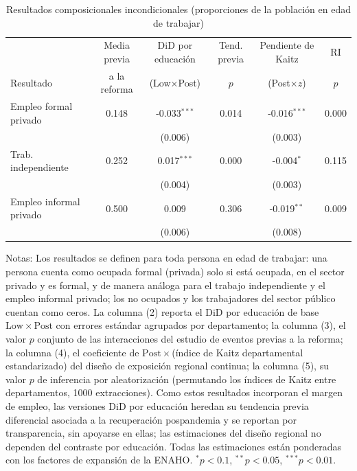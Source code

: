 \begin{table}[!tbp]\centering
\caption{Resultados composicionales incondicionales (proporciones de la población en edad de trabajar)}\label{tab:uncond}
\begin{threeparttable}
\footnotesize
\setlength{\tabcolsep}{4pt}
\begin{tabular}{lccccc}
\toprule
& Media previa & DiD por educación & Tend. previa & Pendiente de Kaitz & RI \\
Resultado & a la reforma & (Low$\times$Post) & $p$ & (Post$\times z$) & $p$ \\
\midrule
Empleo formal privado & 0.148 & -0.033$^{***}$ & 0.014 & -0.016$^{***}$ & 0.000 \\
 & & (0.006) & & (0.003) & \\
Trab. independiente & 0.252 & 0.017$^{***}$ & 0.000 & -0.004$^{*}$ & 0.115 \\
 & & (0.004) & & (0.003) & \\
Empleo informal privado & 0.500 & 0.009 & 0.306 & -0.019$^{**}$ & 0.009 \\
 & & (0.006) & & (0.008) & \\
\bottomrule
\end{tabular}
\begin{tablenotes}\footnotesize
\item Notas: Los resultados se definen para toda persona en edad de trabajar: una persona cuenta como ocupada formal (privada) solo si está ocupada, en el sector privado y es formal, y de manera análoga para el trabajo independiente y el empleo informal privado; los no ocupados y los trabajadores del sector público cuentan como ceros. La columna (2) reporta el DiD por educación de base $\mathrm{Low}\times\mathrm{Post}$ con errores estándar agrupados por departamento; la columna (3), el valor $p$ conjunto de las interacciones del estudio de eventos previas a la reforma; la columna (4), el coeficiente de $\mathrm{Post}\times$(índice de Kaitz departamental estandarizado) del diseño de exposición regional continua; la columna (5), su valor $p$ de inferencia por aleatorización (permutando los índices de Kaitz entre departamentos, 1000 extracciones). Como estos resultados incorporan el margen de empleo, las versiones DiD por educación heredan su tendencia previa diferencial asociada a la recuperación pospandemia y se reportan por transparencia, sin apoyarse en ellas; las estimaciones del diseño regional no dependen del contraste por educación. Todas las estimaciones están ponderadas con los factores de expansión de la ENAHO. $^{*}p<0.1$, $^{**}p<0.05$, $^{***}p<0.01$.
\end{tablenotes}
\end{threeparttable}\end{table}
